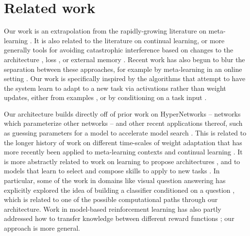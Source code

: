 \documentclass{article}
\begin{document}
\section{Related work}
Our work is an extrapolation from the rapidly-growing literature on meta-learning \citep[e.g.][]{Vinyals2016, Santoro2016, Finn2017a, Finn2018, Stadie2018}. It is also related to the literature on continual learning, or more generally tools for avoiding catastrophic interference based on changes to the architecture \citep[e.g.][]{Fernando2017, Rusu2016}, loss \citep[e.g.][]{Kirkpatrick2016, Zenke2017, Aljundi2019}, or external memory \citep[e.g.][]{Sprechmann2018}. Recent work has also begun to blur the separation between these approaches, for example by meta-learning in an online setting \citep{Finn2019}. Our work is specifically inspired by the algorithms that attempt to have the system learn to adapt to a new task via activations rather than weight updates, either from examples \citep[e.g.][]{Wang2016a, Duan2016}, or by conditioning on a task input \citep[e.g.][]{Borsa2019}. \par
Our architecture builds directly off of prior work on HyperNetworks \citep{Ha2016} -- networks which parameterize other networks -- and other recent applications thereof, such as guessing parameters for a model to accelerate model search \citep[e.g.][]{Brock2018a, Zhang2019}. This is related to the longer history of work on different time-scales of weight adaptation \citep{Hinton1982, Kumaran2016} that has more recently been applied to meta-learning contexts \citep[e.g.][]{Ba2016, Munkhdalai2017} and continual learning \citep[e.g.]{Hu2019}. It is more abstractly related to work on learning to propose architectures \citep[e.g.][]{Zoph2016, Cao2019}, and to models that learn to select and compose skills to apply to new tasks \citep[e.g.][]{Andreas, Andreas2016, Tessler2016, Reed2015}. In particular, some of the work in domains like visual question answering has explicitly explored the idea of building a classifier conditioned on a question \citep{Andreas, Andreasa}, which is related to one of the possible computational paths through our architecture. Work in model-based reinforcement learning has also partly addressed how to transfer knowledge between different reward functions \citep[e.g.][]{Laroche2017}; our approach is more general. \par 
\end{document}
